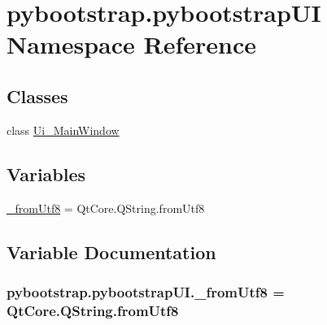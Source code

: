 \hypertarget{namespacepybootstrap_1_1pybootstrapUI}{\section{pybootstrap.\-pybootstrap\-U\-I Namespace Reference}
\label{namespacepybootstrap_1_1pybootstrapUI}
}
\subsection*{Classes}
\begin{DoxyCompactItemize}
\item 
class \hyperlink{classpybootstrap_1_1pybootstrapUI_1_1Ui__MainWindow}{Ui\-\_\-\-Main\-Window}
\end{DoxyCompactItemize}
\subsection*{Variables}
\begin{DoxyCompactItemize}
\item 
\hyperlink{namespacepybootstrap_1_1pybootstrapUI_a0dee7c165487f20822b41dab66077973}{\-\_\-from\-Utf8} = Qt\-Core.\-Q\-String.\-from\-Utf8
\end{DoxyCompactItemize}


\subsection{Variable Documentation}
\hypertarget{namespacepybootstrap_1_1pybootstrapUI_a0dee7c165487f20822b41dab66077973}{
\subsubsection[{\-\_\-from\-Utf8}]{\setlength{\rightskip}{0pt plus 5cm}pybootstrap.\-pybootstrap\-U\-I.\-\_\-from\-Utf8 = Qt\-Core.\-Q\-String.\-from\-Utf8}}\label{namespacepybootstrap_1_1pybootstrapUI_a0dee7c165487f20822b41dab66077973}

